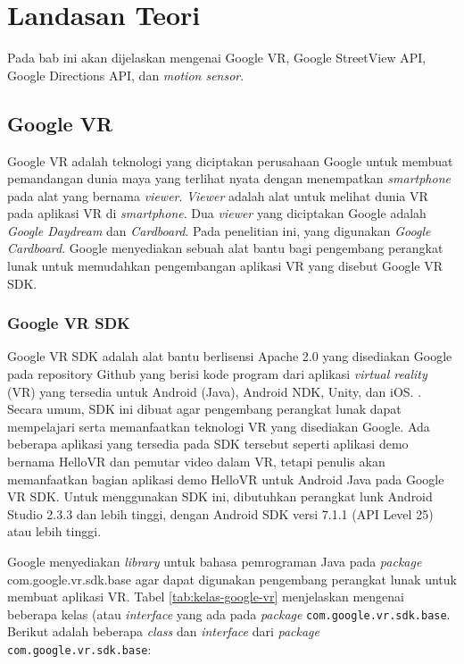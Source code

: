 \chapter{Landasan Teori}
\label{chap:teori}
Pada bab ini akan dijelaskan mengenai Google VR, Google StreetView API, Google Directions API, dan \textit{motion sensor}.

\section{Google VR}
\label{sec:google-vr} 
Google VR adalah teknologi yang diciptakan perusahaan Google untuk membuat pemandangan dunia maya yang terlihat nyata dengan menempatkan \textit{smartphone} pada alat yang bernama \textit{viewer}. \textit{Viewer} adalah alat untuk melihat dunia VR pada aplikasi VR di \textit{smartphone}. Dua \textit{viewer} yang diciptakan Google adalah \textit{Google Daydream} dan \textit{Cardboard}. Pada penelitian ini, yang digunakan \textit{Google Cardboard}. Google menyediakan sebuah alat bantu bagi pengembang perangkat lunak untuk memudahkan pengembangan aplikasi VR yang disebut Google VR SDK.

\subsection{Google VR SDK}
Google VR SDK adalah alat bantu berlisensi Apache 2.0 yang disediakan Google pada repository Github yang berisi kode program dari aplikasi {\it virtual reality} (VR)  yang tersedia untuk Android (Java), Android NDK, Unity, dan iOS. . Secara umum, SDK ini dibuat agar pengembang perangkat lunak dapat mempelajari serta memanfaatkan teknologi VR yang disediakan Google. Ada beberapa aplikasi yang tersedia pada SDK tersebut seperti aplikasi demo bernama HelloVR dan pemutar video dalam VR, tetapi penulis akan memanfaatkan bagian aplikasi demo HelloVR untuk Android Java pada Google VR SDK. Untuk menggunakan SDK ini, dibutuhkan perangkat lunk Android Studio 2.3.3 dan lebih tinggi, dengan Android SDK versi 7.1.1 (API Level 25) atau lebih tinggi. 

Google menyediakan \textit{library} untuk bahasa pemrograman Java pada \textit{package} com.google.vr.sdk.base agar dapat digunakan pengembang perangkat lunak untuk membuat aplikasi VR. Tabel \ref{tab:kelas-google-vr} menjelaskan mengenai beberapa kelas (atau \textit{interface} yang ada pada \textit{package} \texttt{com.google.vr.sdk.base}. Berikut adalah beberapa \textit{class} dan \textit{interface} dari \textit{package} \texttt{com.google.vr.sdk.base}:

